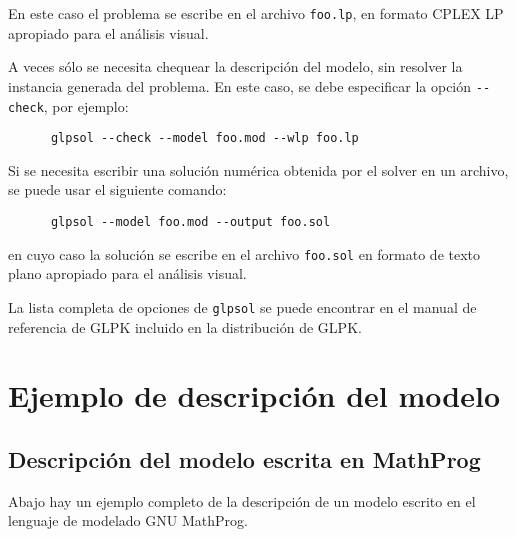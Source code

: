 \documentclass[11pt,spanish]{report}
\begin{document}
\noindent En este caso el problema se escribe en el archivo \verb|foo.lp|, en formato CPLEX LP apropiado para el análisis visual.

\newpage

A veces sólo se necesita chequear la descripción del modelo, sin resolver la instancia generada del problema. En este caso, se debe especificar la opción \verb|--check|, por ejemplo:

\begin{verbatim}
      glpsol --check --model foo.mod --wlp foo.lp
\end{verbatim}

Si se necesita escribir una solución numérica obtenida por el solver en un archivo, se puede usar el siguiente comando:

\begin{verbatim}
      glpsol --model foo.mod --output foo.sol
\end{verbatim}

\noindent en cuyo caso la solución se escribe en el archivo \verb|foo.sol| en formato de texto plano apropiado para el análisis visual.

La lista completa de opciones de \verb|glpsol| se puede encontrar en el manual de referencia de GLPK incluido en la distribución de GLPK.


\chapter{Ejemplo de descripción del modelo}

\section{Descripción del modelo escrita en MathProg}

Abajo hay un ejemplo completo de la descripción de un modelo escrito en el lenguaje de modelado GNU MathProg.

\bigskip
\end{document}
